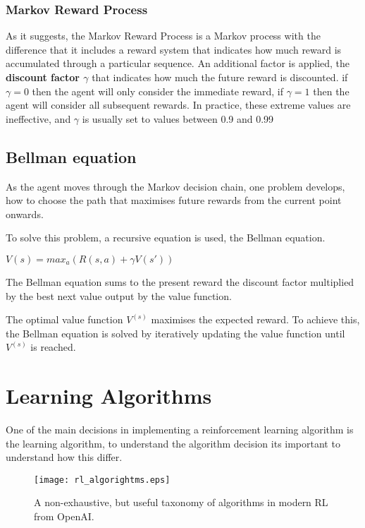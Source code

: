  \subsubsection*{Markov Reward Process}
 As it suggests, the Markov Reward Process is a Markov process with the difference that it includes a reward system that indicates how much reward is accumulated through a particular sequence.
 An additional factor is applied, the \textbf{discount factor $\gamma$} that indicates how much the future reward is discounted. if $\gamma = 0$ 
 then the agent will only consider the immediate reward, if $\gamma = 1$ then the agent will consider all subsequent rewards. 
 In practice, these extreme values are ineffective, and $\gamma$ is usually set to values between 0.9 and 0.99

 \subsection{Bellman equation}
 As the agent moves through the Markov decision chain, one problem develops, how to choose the path that maximises future rewards from the current point onwards. 
 
 To solve this problem, a recursive equation is used, the Bellman equation.
 
 $V(s) = max_a (R(s,a)+\gamma V(s')) $ 
 
 The Bellman equation sums to the present reward the discount factor multiplied by the best next value output by the value function.

 The optimal value function $V^{(s)}$ maximises the expected reward. To achieve this, the Bellman equation is solved by iteratively updating the value function until $V^{(s)}$ is reached.


\section{Learning Algorithms}
One of the main decisions in implementing a reinforcement learning algorithm is the learning algorithm, to understand the algorithm decision its important to understand how this differ.
\begin{figure}[H]
\centering
\texttt{[image: rl\_algorightms.eps]}
\caption{A non-exhaustive, but useful taxonomy of algorithms in modern RL from OpenAI\cite{openai_rl}.}
\label{fig:rl_algorightms}
\end{figure}

